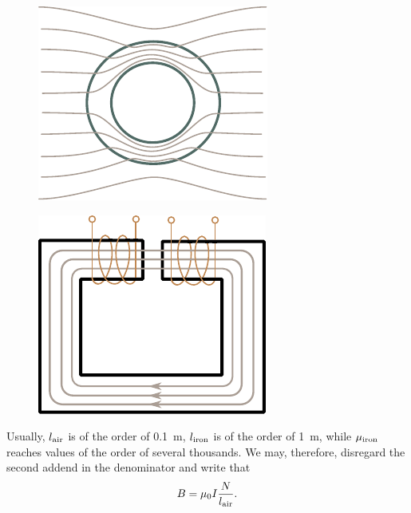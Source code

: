 \begin{figure}[t]
	\begin{minipage}[t]{0.48\linewidth}
		\begin{center}
			\includegraphics[scale=1]{figures/ch_07/fig_7_8.pdf}
			\caption[]{}
			\label{fig:7_8}
		\end{center}
	\end{minipage}
	\hfill{ }%
	\begin{minipage}[t]{0.48\linewidth}
		\begin{center}
			\includegraphics[scale=1]{figures/ch_07/fig_7_9.pdf}
			\caption[]{}
			\label{fig:7_9}
		\end{center}
	\end{minipage}
\vspace{-0.4cm}
\end{figure}

Usually, $l_{\text{air}}$ is of the order of \SI{0.1}{\metre}, $l_{\text{iron}}$ is of the order of \SI{1}{\metre}, while $\mu_{\text{iron}}$ reaches values of the order of several thousands.
We may, therefore, disregard the second addend in the denominator and write that
\begin{equation}\label{eq:7_38}
    B = \mu_0 I \frac{N}{l_{\text{air}}}.
\end{equation}

